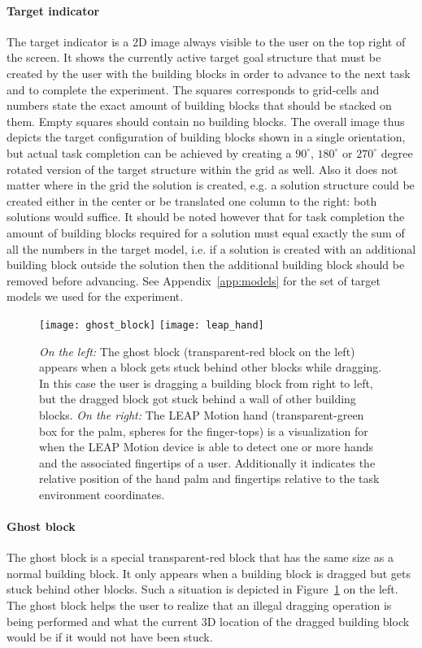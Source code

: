 \paragraph{Target indicator}
The target indicator is a 2D image always visible to the user on the top right of the screen. It shows the currently active target goal structure that must be created by the user with the building blocks in order to advance to the next task and to complete the experiment. The squares corresponds to grid-cells and numbers state the exact amount of building blocks that should be stacked on them. Empty squares should contain no building blocks. The overall image thus depicts the target configuration of building blocks shown in a single orientation, but actual task completion can be achieved by creating a $90^{\circ}$, $180^{\circ}$ or $270^{\circ}$ degree rotated version of the target structure within the grid as well. Also it does not matter where in the grid the solution is created, e.g. a solution structure could be created either in the center or be translated one column to the right: both solutions would suffice. It should be noted however that for task completion the amount of building blocks required for a solution must equal exactly the sum of all the numbers in the target model, i.e. if a solution is created with an additional building block outside the solution then the additional building block should be removed before advancing. See Appendix~\ref{app:models} for the set of target models we used for the experiment.


\begin{figure}[H]
\centering
\texttt{[image: ghost\_block]}
\texttt{[image: leap\_hand]}
\caption{\label{fig:ghostblock} \textit{On the left:} The ghost block (transparent-red block on the left) appears when a block gets stuck behind other blocks while dragging. In this case the user is dragging a building block from right to left, but the dragged block got stuck behind a wall of other building blocks. \textit{On the right:} The LEAP Motion hand (transparent-green box for the palm, spheres for the finger-tops) is a visualization for when the LEAP Motion device is able to detect one or more hands and the associated fingertips of a user. Additionally it indicates the relative position of the hand palm and fingertips relative to the task environment coordinates. 
}
\end{figure}

\paragraph{Ghost block}
The ghost block is a special transparent-red block that has the same size as a normal building block. It only appears when a building block is dragged but gets stuck behind other blocks. Such a situation is depicted in Figure~\ref{fig:ghostblock} on the left. The ghost block helps the user to realize that an illegal dragging operation is being performed and what the current 3D location of the dragged building block would be if it would not have been stuck.


